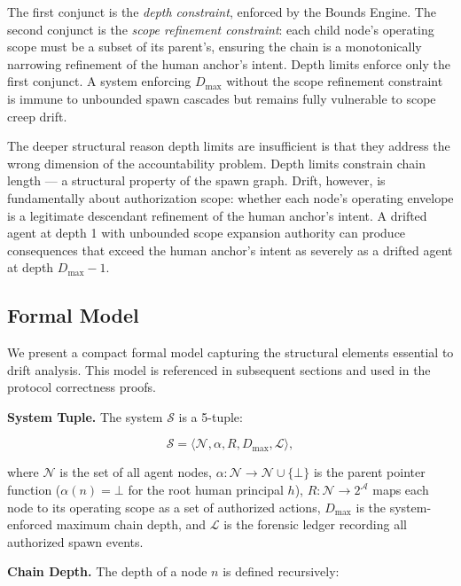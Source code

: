 The first conjunct is the \emph{depth constraint}, enforced by the Bounds Engine. The second conjunct is the \emph{scope refinement constraint}: each child node's operating scope must be a subset of its parent's, ensuring the chain is a monotonically narrowing refinement of the human anchor's intent. Depth limits enforce only the first conjunct. A system enforcing $D_{\max}$ without the scope refinement constraint is immune to unbounded spawn cascades but remains fully vulnerable to scope creep drift.

The deeper structural reason depth limits are insufficient is that they address the wrong dimension of the accountability problem. Depth limits constrain chain length — a structural property of the spawn graph. Drift, however, is fundamentally about authorization scope: whether each node's operating envelope is a legitimate descendant refinement of the human anchor's intent. A drifted agent at depth 1 with unbounded scope expansion authority can produce consequences that exceed the human anchor's intent as severely as a drifted agent at depth $D_{\max} - 1$.

\subsection{Formal Model}
\label{sec:drift-formal-model}

We present a compact formal model capturing the structural elements essential to drift analysis. This model is referenced in subsequent sections and used in the protocol correctness proofs.

\medskip
\noindent\textbf{System Tuple.}
The system $\mathcal{S}$ is a 5-tuple:

\begin{equation}
\mathcal{S} = \langle \mathcal{N}, \alpha, R, D_{\max}, \mathcal{L} \rangle,
\label{eq:system-model}
\end{equation}

where $\mathcal{N}$ is the set of all agent nodes, $\alpha: \mathcal{N} \rightarrow \mathcal{N} \cup \{\bot\}$ is the parent pointer function ($\alpha(n) = \bot$ for the root human principal $h$), $R: \mathcal{N} \rightarrow 2^{\mathcal{A}}$ maps each node to its operating scope as a set of authorized actions, $D_{\max}$ is the system-enforced maximum chain depth, and $\mathcal{L}$ is the forensic ledger recording all authorized spawn events.

\medskip
\noindent\textbf{Chain Depth.}
The depth of a node $n$ is defined recursively:


